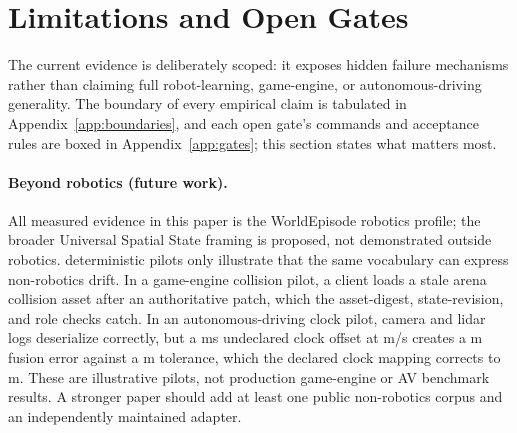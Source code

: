 \section{Limitations and Open Gates}
\label{sec:limits}

The current evidence is deliberately scoped: it exposes hidden failure mechanisms rather than
claiming full robot-learning, game-engine, or autonomous-driving generality. The boundary of every
empirical claim is tabulated in Appendix~\ref{app:boundaries}, and each open gate's commands and
acceptance rules are boxed in Appendix~\ref{app:gates}; this section states what matters most.

\paragraph{Beyond robotics (future work).}
All measured evidence in this paper is the WorldEpisode robotics profile; the broader Universal
Spatial State framing is proposed, not demonstrated outside robotics. \ExpNonrobotPilotCount{}
deterministic pilots only
illustrate that the same vocabulary can express non-robotics drift. In a game-engine collision pilot,
a client loads a stale arena collision asset after an authoritative patch, which the asset-digest,
state-revision, and role checks catch. In an autonomous-driving clock pilot, camera and lidar logs
deserialize correctly, but a \ExpAvClockOffsetMilliseconds{} ms undeclared clock offset at
\ExpAvSpeedMetersPerSecond{} m/s creates a \ExpAvFusionErrorMeters{} m fusion error against a
\ExpAvToleranceMeters{} m tolerance, which the declared clock mapping corrects to
\ExpAvCorrectedErrorMeters{} m. These are
illustrative pilots, not production game-engine or AV benchmark results. A stronger paper should add
at least one public non-robotics corpus and an independently maintained adapter.


